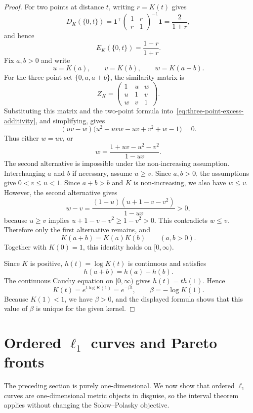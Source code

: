 \documentclass[12pt,a4paper]{article}
\begin{document}
\begin{proof}
For two points at distance $t$, writing $r=K(t)$ gives
\[
  D_K(\{0,t\})
  =\mathbf{1}^\top
  \begin{pmatrix}1&r\\ r&1\end{pmatrix}^{-1}
  \mathbf{1}
  =\frac{2}{1+r},
\]
and hence
\[
  E_K(\{0,t\})=\frac{1-r}{1+r}.
\]
Fix $a,b>0$ and write
\[
  u=K(a),\qquad v=K(b),\qquad w=K(a+b).
\]
For the three-point set $\{0,a,a+b\}$, the similarity matrix is
\[
  Z_K=
  \begin{pmatrix}
  1 & u & w\\
  u & 1 & v\\
  w & v & 1
  \end{pmatrix}.
\]
Substituting this matrix and the two-point formula into~\eqref{eq:three-point-excess-additivity}, and simplifying, gives
\[
  (uv-w)\bigl(u^2-uvw-uv+v^2+w-1\bigr)=0.
\]
Thus either $w=uv$, or
\[
  w=\frac{1+uv-u^2-v^2}{1-uv}.
\]
The second alternative is impossible under the non-increasing assumption.  Interchanging $a$ and $b$ if necessary, assume $u\geq v$.  Since $a,b>0$, the assumptions give $0<v\leq u<1$.  Since $a+b>b$ and $K$ is non-increasing, we also have $w\leq v$.  However, the second alternative gives
\[
  w-v
  =\frac{(1-u)(u+1-v-v^2)}{1-uv}>0,
\]
because $u\geq v$ implies $u+1-v-v^2\geq1-v^2>0$.  This contradicts $w\leq v$.  Therefore only the first alternative remains, and
\[
  K(a+b)=K(a)K(b)
  \qquad(a,b>0).
\]
Together with $K(0)=1$, this identity holds on $[0,\infty)$.

Since $K$ is positive, $h(t)=\log K(t)$ is continuous and satisfies
\[
  h(a+b)=h(a)+h(b).
\]
The continuous Cauchy equation on $[0,\infty)$ gives $h(t)=t h(1)$.  Hence
\[
  K(t)=e^{t\log K(1)}=e^{-\beta t},
  \qquad
  \beta=-\log K(1).
\]
Because $K(1)<1$, we have $\beta>0$, and the displayed formula shows that this value of $\beta$ is unique for the given kernel.
\end{proof}

\section{Ordered \texorpdfstring{$\ell_1$}{L1} curves and Pareto fronts}
\label{sec:ordered-l1-curves}

The preceding section is purely one-dimensional.  We now show that ordered $\ell_1$ curves are one-dimensional metric objects in disguise, so the interval theorem applies without changing the Solow--Polasky objective.
\end{document}
